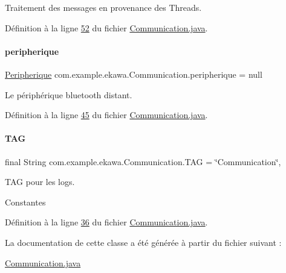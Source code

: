 Traitement des messages en provenance des Threads. 



Définition à la ligne \hyperlink{_communication_8java_source_l00052}{52} du fichier \hyperlink{_communication_8java_source}{Communication.\+java}.

\mbox{\label{classcom_1_1example_1_1ekawa_1_1_communication_a59a25b4807148701560e4341f79c0c16}} 
\paragraph{\texorpdfstring{peripherique}{peripherique}}
{\footnotesize\ttfamily \hyperlink{classcom_1_1example_1_1ekawa_1_1_peripherique}{Peripherique} com.\+example.\+ekawa.\+Communication.\+peripherique = null\hspace{0.3cm}{\ttfamily [private]}}



Le périphérique bluetooth distant. 



Définition à la ligne \hyperlink{_communication_8java_source_l00045}{45} du fichier \hyperlink{_communication_8java_source}{Communication.\+java}.

\mbox{\label{classcom_1_1example_1_1ekawa_1_1_communication_af355bac38153a4e6d1cda0b3e74bc1c7}} 
\paragraph{\texorpdfstring{T\+AG}{TAG}}
{\footnotesize\ttfamily final String com.\+example.\+ekawa.\+Communication.\+T\+AG = \char`\"{}Communication\char`\"{}\hspace{0.3cm}{\ttfamily [static]}, {\ttfamily [private]}}



T\+AG pour les logs. 

Constantes 

Définition à la ligne \hyperlink{_communication_8java_source_l00036}{36} du fichier \hyperlink{_communication_8java_source}{Communication.\+java}.



La documentation de cette classe a été générée à partir du fichier suivant \+:\begin{DoxyCompactItemize}
\item 
\hyperlink{_communication_8java}{Communication.\+java}\end{DoxyCompactItemize}
